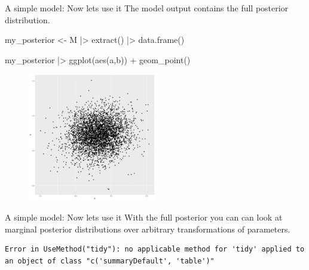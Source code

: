 \documentclass[
  11pt,
  ignorenonframetext,
]{beamer}
\newenvironment{Shaded}{\begin{snugshade}}{\end{snugshade}}
\newcommand{\AttributeTok}[1]{\textcolor[rgb]{0.40,0.45,0.13}{#1}}
\newcommand{\DecValTok}[1]{\textcolor[rgb]{0.68,0.00,0.00}{#1}}
\newcommand{\FunctionTok}[1]{\textcolor[rgb]{0.28,0.35,0.67}{#1}}
\newcommand{\NormalTok}[1]{\textcolor[rgb]{0.00,0.23,0.31}{#1}}
\newcommand{\OtherTok}[1]{\textcolor[rgb]{0.00,0.23,0.31}{#1}}
\newcommand{\SpecialCharTok}[1]{\textcolor[rgb]{0.37,0.37,0.37}{#1}}
\begin{document}
\begin{frame}[fragile]{A simple model: Now lets use it}
\protect\hypertarget{a-simple-model-now-lets-use-it}{}
The model output contains the full posterior distribution.

\begin{Shaded}
\begin{Highlighting}[]
\NormalTok{my\_posterior }\OtherTok{\textless{}{-}}\NormalTok{ M }\SpecialCharTok{|\textgreater{}} \FunctionTok{extract}\NormalTok{() }\SpecialCharTok{|\textgreater{}} \FunctionTok{data.frame}\NormalTok{() }

\NormalTok{my\_posterior }\SpecialCharTok{|\textgreater{}} \FunctionTok{ggplot}\NormalTok{(}\FunctionTok{aes}\NormalTok{(a,b)) }\SpecialCharTok{+} \FunctionTok{geom\_point}\NormalTok{()}
\end{Highlighting}
\end{Shaded}

\begin{figure}

{\centering \includegraphics[width=0.5\textwidth,height=\textheight]{0_lectures_files/figure-beamer/figposta-1.pdf}

}

\end{figure}
\end{frame}

\begin{frame}[fragile]{A simple model: Now lets use it}
\protect\hypertarget{a-simple-model-now-lets-use-it-1}{}
With the full posterior you can can look at marginal posterior
distributions over arbitrary transformations of parameters.

\begin{Shaded}
\end{Shaded}

\begin{verbatim}
Error in UseMethod("tidy"): no applicable method for 'tidy' applied to an object of class "c('summaryDefault', 'table')"
\end{verbatim}
\end{frame}
\end{document}
